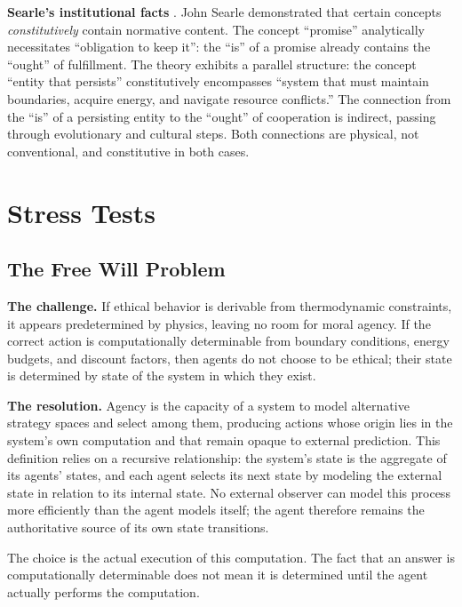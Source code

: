 \documentclass[11pt]{article}
\theoremstyle{plain}
\theoremstyle{definition}
\theoremstyle{remark}
\let\origsection\section
\renewcommand{\section}{\needspace{12\baselineskip}\origsection}
\let\origsubsection\subsection
\renewcommand{\subsection}{\needspace{7\baselineskip}\origsubsection}
\begin{document}
\textbf{Searle's institutional facts} \citep{Searle1964}. John Searle
demonstrated that certain concepts \emph{constitutively} contain
normative content. The concept ``promise'' analytically necessitates
``obligation to keep it'': the ``is'' of a promise already contains the
``ought'' of fulfillment. The theory exhibits a parallel structure: the
concept ``entity that persists'' constitutively encompasses ``system
that must maintain boundaries, acquire energy, and navigate resource
conflicts.'' The connection from the ``is'' of a persisting entity to
the ``ought'' of cooperation is indirect, passing through evolutionary
and cultural steps. Both connections are physical, not conventional, and
constitutive in both cases.

\section{Stress Tests}\label{stress-tests}

\subsection{The Free Will Problem}\label{the-free-will-problem}

\textbf{The challenge.} If ethical behavior is derivable from
thermodynamic constraints, it appears predetermined by physics, leaving
no room for moral agency. If the correct action is computationally
determinable from boundary conditions, energy budgets, and discount
factors, then agents do not choose to be ethical; their state is
determined by state of the system in which they exist.

\textbf{The resolution.} Agency is the capacity of a system to model
alternative strategy spaces and select among them, producing actions
whose origin lies in the system's own computation and that remain opaque
to external prediction. This definition relies on a recursive
relationship: the system's state is the aggregate of its agents' states,
and each agent selects its next state by modeling the external state in
relation to its internal state. No external observer can model this
process more efficiently than the agent models itself; the agent
therefore remains the authoritative source of its own state transitions.

The choice is the actual execution of this computation. The fact that an
answer is computationally determinable does not mean it is determined
until the agent actually performs the computation.
\end{document}
